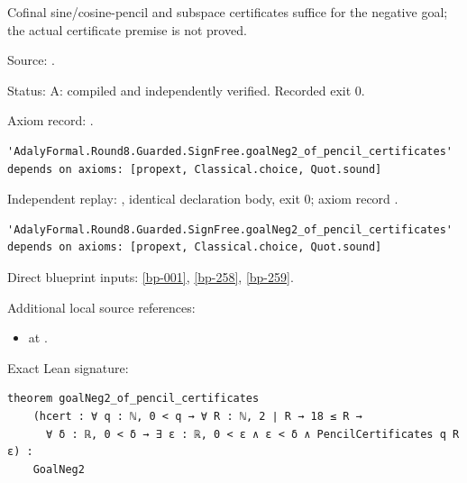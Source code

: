 \begin{theorem}[bp-080]
\label{bp-080}
\leanok
Cofinal sine/cosine-pencil and subspace certificates suffice for the negative goal; the actual certificate premise is not proved.

\par Source: \texttt{}.
\par Status: A: compiled and independently verified. Recorded exit 0.
\par Axiom record: \texttt{}.
\begin{verbatim}
'AdalyFormal.Round8.Guarded.SignFree.goalNeg2_of_pencil_certificates' depends on axioms: [propext, Classical.choice, Quot.sound]
\end{verbatim}
\par Independent replay: \texttt{}, identical declaration body, exit 0; axiom record \texttt{}.
\begin{verbatim}
'AdalyFormal.Round8.Guarded.SignFree.goalNeg2_of_pencil_certificates' depends on axioms: [propext, Classical.choice, Quot.sound]
\end{verbatim}
\par Direct blueprint inputs: \ref{bp-001}, \ref{bp-258}, \ref{bp-259}.
\par Additional local source references:
\begin{itemize}
\item \texttt{} at \texttt{}.
\end{itemize}
\par Exact Lean signature:
\begin{verbatim}
theorem goalNeg2_of_pencil_certificates
    (hcert : ∀ q : ℕ, 0 < q → ∀ R : ℕ, 2 ∣ R → 18 ≤ R →
      ∀ δ : ℝ, 0 < δ → ∃ ε : ℝ, 0 < ε ∧ ε < δ ∧ PencilCertificates q R ε) :
    GoalNeg2
\end{verbatim}
\end{theorem}

